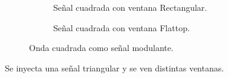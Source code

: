 \begin{figure}[H]
\begin{subfigure}[H]{0.48\textwidth}
          \caption{Señal cuadrada con ventana Rectangular.}
          \label{fig:Exp6SeñalFMModulanteCuadradaRectangular}
        \end{subfigure}
        \begin{subfigure}[H]{0.3\textwidth}
          \caption{Señal cuadrada con ventana Flattop.}
          \label{fig:Exp6SeñalFMModulanteCuadradaFlattop}
        \end{subfigure}
        \caption{Onda cuadrada como señal modulante.}
        \label{fig:Exp6SeñalFMModulanteCuadrada}
      \end{figure}   

      Se inyecta una señal triangular y se ven distintas ventanas.

